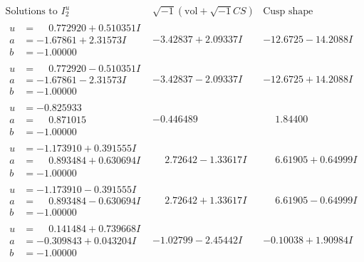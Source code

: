 \documentclass[1p]{elsarticle_modified}
\theoremstyle{definition}
\newcommand{\I}{\sqrt{-1}}
\begin{document}
$$\begin{array}{c|c|c}  
\text{Solutions to }I^u_{2}& \I (\text{vol} + \sqrt{-1}CS) & \text{Cusp shape}\\
 \hline 
\begin{aligned}
u &= \phantom{-}0.772920 + 0.510351 I \\
a &= -1.67861 + 2.31573 I \\
b &= -1.00000\phantom{ +0.000000I}\end{aligned}
 & -3.42837 + 2.09337 I & -12.6725 - 14.2088 I \\ \hline\begin{aligned}
u &= \phantom{-}0.772920 - 0.510351 I \\
a &= -1.67861 - 2.31573 I \\
b &= -1.00000\phantom{ +0.000000I}\end{aligned}
 & -3.42837 - 2.09337 I & -12.6725 + 14.2088 I \\ \hline\begin{aligned}
u &= -0.825933\phantom{ +0.000000I} \\
a &= \phantom{-}0.871015\phantom{ +0.000000I} \\
b &= -1.00000\phantom{ +0.000000I}\end{aligned}
 & -0.446489\phantom{ +0.000000I} & \phantom{-}1.84400\phantom{ +0.000000I} \\ \hline\begin{aligned}
u &= -1.173910 + 0.391555 I \\
a &= \phantom{-}0.893484 + 0.630694 I \\
b &= -1.00000\phantom{ +0.000000I}\end{aligned}
 & \phantom{-}2.72642 - 1.33617 I & \phantom{-}6.61905 + 0.64999 I \\ \hline\begin{aligned}
u &= -1.173910 - 0.391555 I \\
a &= \phantom{-}0.893484 - 0.630694 I \\
b &= -1.00000\phantom{ +0.000000I}\end{aligned}
 & \phantom{-}2.72642 + 1.33617 I & \phantom{-}6.61905 - 0.64999 I \\ \hline\begin{aligned}
u &= \phantom{-}0.141484 + 0.739668 I \\
a &= -0.309843 + 0.043204 I \\
b &= -1.00000\phantom{ +0.000000I}\end{aligned}
 & -1.02799 - 2.45442 I & -0.10038 + 1.90984 I \\ \hline\begin{aligned}

\end{aligned}
\end{array}$$
\end{document}

